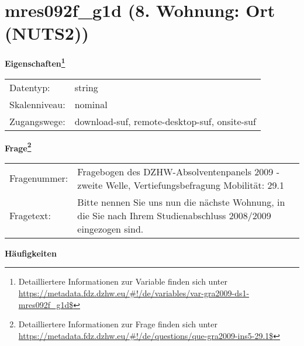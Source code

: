 
    \setcounter{footnote}{0}

    \vspace*{-1.8cm}
	\section{mres092f\_g1d (8. Wohnung: Ort (NUTS2))}
	\label{section:mres092f_g1d}



    \vspace*{0.5cm}
    \noindent\textbf{Eigenschaften\footnote{Detailliertere Informationen zur Variable finden sich unter
		\url{https://metadata.fdz.dzhw.eu/\#!/de/variables/var-gra2009-ds1-mres092f_g1d$}}}\\
	\begin{tabularx}{\hsize}{@{}lX}
	Datentyp: & string \\
	Skalenniveau: & nominal \\
	Zugangswege: &
	  download-suf, 
	  remote-desktop-suf, 
	  onsite-suf
 \\
    \end{tabularx}



				\vspace*{0.5cm}
                \noindent\textbf{Frage\footnote{Detailliertere Informationen zur Frage finden sich unter
		              \url{https://metadata.fdz.dzhw.eu/\#!/de/questions/que-gra2009-ins5-29.1$}}}\\
				\begin{tabularx}{\hsize}{@{}lX}
					Fragenummer: &
					  Fragebogen des DZHW-Absolventenpanels 2009 - zweite Welle, Vertiefungsbefragung Mobilität:
					  29.1
 \\
					Fragetext: & Bitte nennen Sie uns nun die nächste Wohnung, in die Sie nach Ihrem Studienabschluss 2008/2009 eingezogen sind. \\
				\end{tabularx}





        		\vspace*{0.5cm}
                \noindent\textbf{Häufigkeiten}

